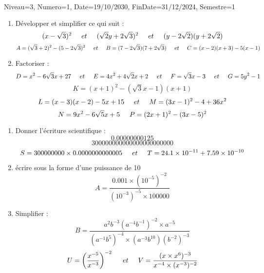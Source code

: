 \documentclass[a4paper,12pt]{article}
\begin{document}
\begin{Maquette}[DM]{Niveau=3, Numero=1, Date=19/10/2030, FinDate=31/12/2024, Semestre=1}

\begin{exercice}
\begin{enumerate}
\item Développer et simplifier ce qui suit : 
\[ (x-\sqrt{3})^{2}\hspace*{0.5cm}et\hspace*{0.5cm}
	(\sqrt{2}y+2\sqrt{3})^{2}\hspace*{0.5cm}et\hspace*{0.5cm}
		(y-2\sqrt{2})(y+2\sqrt{2})\]
\[
A=(\sqrt{3}+2)^{2}-(5-2\sqrt{3})^{2}\hspace*{0.5 cm}et\hspace*{0.5 cm}
B=(7-2\sqrt{3})(7+2\sqrt{3})\hspace*{0.5 cm}et\hspace*{0.5 cm}
C=(x-2)(x+3)-5(x-1)
\]		
\item Factoriser :
\[ D=x^{2}-6\sqrt{3}x+27\hspace*{0.5cm}et\hspace*{0.5cm}
	E=4x^{2}+4\sqrt{2}x+2\hspace*{0.5cm}et\hspace*{0.5cm}
		F=\sqrt{3}x-3\hspace*{0.5cm}et\hspace*{0.5cm}
		G=5y^{2}-1\]
	\[K=(x+1)^{2}-(\sqrt{3}x-1)(x+1)\]
	\[
L=(x-3)(x-2)-5x+15\hspace*{0.5 cm}et\hspace*{0.5 cm}
M=(3x-1)^{2}-4+36x^{2}\]
\[N=9x^{2}-6\sqrt{5}x+5\hspace*{0.5 cm}
P=(2x+1)^{2}-(3x-5)^{2}
\]
\end{enumerate}
\end{exercice}

\begin{exercice}
\begin{enumerate}

\item Donner l'écriture scientifique :
\[0.00000000125 \]
\[300000000000000000000000 \]
\[
S=300000000 \times 0.0000000000005 \hspace*{0.5cm}et\hspace*{0.5cm}
T=24.1 \times 10^{-11}+ 7.59 \times 10^{-10}
\]
\item écrire sous la forme d'une puissance de 10
\[ A=\dfrac{0.001 \times (10^{-5})^{-2}}{(10^{-3})^{-5}\times 100000}\]
\item Simplifier :
\[ B=\dfrac{a^{2}b^{-3}(a^{-4}b^{-1})^{-2}\times a^{-5}}{(a^{-1}b^{5})^{-4}\times (a^{-3}b^{10})(b^{-2})^{-3}} \]
\[
U=\left( \dfrac{x^{-5}}{x^{-3}}\right)^{-2} \hspace*{0.5cm}et\hspace*{0.5cm}
V=\dfrac{(x \times x^{6})^{-3}}{x^{-4}\times (x^{-3})^{-2}}
\]
\end{enumerate}
\end{exercice}


\end{Maquette}
\end{document}
